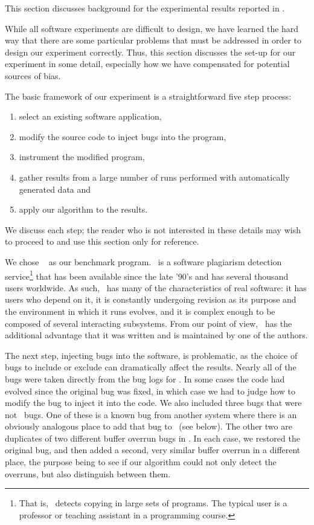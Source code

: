 This section discusses background for the experimental results
reported in .

While all software experiments are difficult to design, we have
learned the hard way that there are some particular problems that must
be addressed in order to design our experiment correctly.
Thus, this section discusses the set-up for our
experiment in some detail, especially how we have compensated for
potential sources of bias.

The basic framework of our experiment is a straightforward five step
process:
\begin{enumerate}
\item select an existing software application,
\item modify the source code to inject bugs into the program,
\item instrument the modified program,
\item gather results from a large number of runs performed with automatically generated data and
\item apply our algorithm to the results.
\end{enumerate}
We discuss each step; the reader who is not interested in
these details may wish to proceed to  and
use this section only for reference.

We chose \moss\ \cite{Schleimer:2003:WLA} as our benchmark program.  \moss\ is a
software plagiarism detection service\footnote{That is,
\moss\ detects copying in large sets of programs.  The typical \moss
user is a professor or teaching assistant in a programming course.}
that has been available since the late '90's and has several thousand
users worldwide.  As such, \moss\ has many of the characteristics of
real software: it has users who depend on it, it is constantly
undergoing revision as its purpose and the environment in which it
runs evolves, and it is complex enough to be composed of several
interacting subsystems.  
From our point of view, \moss\ has the additional advantage that it
was written and is maintained by one of the authors.

The next step, injecting bugs into the software, is problematic, as
the choice of bugs to include or exclude can dramatically affect the
results.  Nearly all of the bugs were taken directly from the bug
logs for \moss.  In some cases the code had evolved since the original
bug was fixed, in which case we had to judge how to modify the
bug to inject it into the code.  We also included three bugs that
were not \moss\ bugs.  One of these is a known bug from another system
where there is an obviously analogous place to add that bug to \moss\
(see below). The other two are duplicates of two different buffer
overrun bugs in \moss.  In each case, we restored the original bug,
and then added a second, very similar buffer overrun in a different
place, the purpose being to see if our algorithm could not only detect
the overruns, but also distinguish between them.

